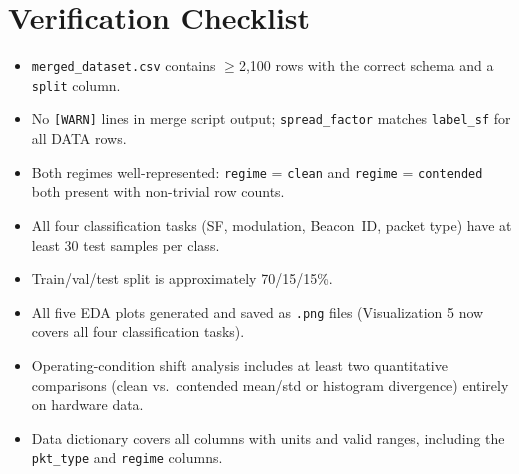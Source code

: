 \documentclass[11pt,letterpaper]{article}
\begin{document}
\section{Verification Checklist}
\begin{itemize}[leftmargin=2em]
	\item[$\square$] \texttt{merged\_dataset.csv} contains $\geq$2{,}100 rows with the correct schema and a \texttt{split} column.
	\item[$\square$] No \texttt{[WARN]} lines in merge script output; \texttt{spread\_factor} matches \texttt{label\_sf} for all DATA rows.
	\item[$\square$] Both regimes well-represented: \texttt{regime} = \texttt{clean} and \texttt{regime} = \texttt{contended} both present with non-trivial row counts.
	\item[$\square$] All four classification tasks (SF, modulation, Beacon~ID, packet type) have at least 30 test samples per class.
	\item[$\square$] Train/val/test split is approximately 70/15/15\%.
	\item[$\square$] All five \mbox{EDA} plots generated and saved as \texttt{.png} files (Visualization 5 now covers all four classification tasks).
	\item[$\square$] Operating-condition shift analysis includes at least two quantitative comparisons (clean vs.\ contended mean/std or histogram divergence) entirely on hardware data.
	\item[$\square$] Data dictionary covers all columns with units and valid ranges, including the \texttt{pkt\_type} and \texttt{regime} columns.
\end{itemize}
\end{document}
